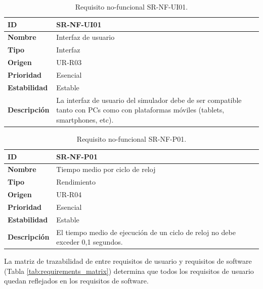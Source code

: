 \begin{center}
\begin{table}[htbp]
\centering
\caption{Requisito no-funcional SR-NF-UI01.}
\begin{tabular}{@{}p{2.5cm} p{9cm}@{}} 
\toprule
\textbf{ID} 				& SR-NF-UI01 \\
\midrule
\textbf{Nombre} 			& Interfaz de usuario \\
\midrule
\textbf{Tipo} 			& Interfaz \\
\midrule
\textbf{Origen} 			& UR-R03 \\
\midrule
\textbf{Prioridad}		& Esencial \\
\midrule
\textbf{Estabilidad} 		& Estable \\
\midrule
\textbf{Descripción} 	& La interfaz de usuario del simulador debe de ser compatible tanto con PCs como con plataformas móviles (tablets, smartphones, etc). \\
\bottomrule
\end{tabular}
\label{tab:srnfui01}
\end{table}
\end{center}

\begin{center}
\begin{table}[htbp]
\centering
\caption{Requisito no-funcional SR-NF-P01.}
\begin{tabular}{@{}p{2.5cm} p{9cm}@{}} 
\toprule
\textbf{ID} 				& SR-NF-P01 \\
\midrule
\textbf{Nombre} 			& Tiempo medio por ciclo de reloj \\
\midrule
\textbf{Tipo} 			& Rendimiento \\
\midrule
\textbf{Origen} 			& UR-R04 \\
\midrule
\textbf{Prioridad}		& Esencial \\
\midrule
\textbf{Estabilidad} 		& Estable \\
\midrule
\textbf{Descripción} 	& El tiempo medio de ejecución de un ciclo de reloj no debe exceder 0,1 segundos. \\
\bottomrule
\end{tabular}
\label{tab:srnfp01}
\end{table}
\end{center}

La matriz de trazabilidad de entre requisitos de usuario y requisitos de software (Tabla \ref{tab:requirements_matrix}) determina que todos los requisitos de usuario quedan reflejados en los requisitos de software.

